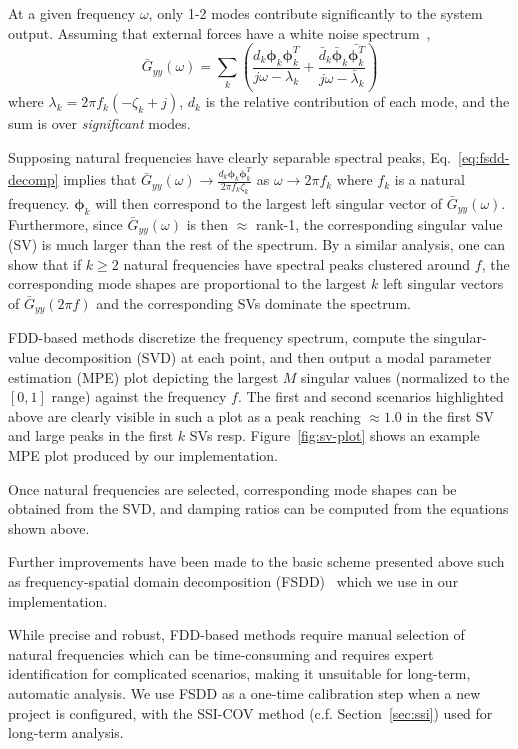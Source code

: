 \documentclass[journal,a4paper]{IEEEtran}
\begin{document}
At a given frequency $\omega$, only 1-2 modes contribute significantly to the system output. Assuming that external forces have a white noise spectrum~\cite{Brincker2000OutputonlyMA}, 
\begin{equation}
\bar{G}_{yy}(\omega)
=
\sum_{k}
\left(
\frac{d_k \bm{\phi}_k \bm{\phi}_k^{T}}{j\omega-\lambda_k}
+
\frac{\bar{d}_k \bar{\bm{\phi}}_k \bar{\bm{\phi}_k^{T}}}
{j\omega-\bar{\lambda}_k}
\right)
\label{eq:fsdd-decomp}
\end{equation}
where $\lambda_k = 2\pi f_k\left(-\zeta_k + j\right)$, $d_k$ is the relative contribution of each mode, and the sum is over \textit{significant} modes.

Supposing natural frequencies have clearly separable spectral peaks, Eq.~\eqref{eq:fsdd-decomp} implies that $\bar{G}_{yy}(\omega) \to \frac{d_k \bm{\phi}_k \bm{\phi}_k^{T}}{2\pi f_k\zeta_k}$ as $\omega \to 2\pi f_k$ where $f_k$ is a natural frequency. $\bm{\phi}_k$ will then correspond to the largest left singular vector of $\bar{G}_{yy}(\omega)$. Furthermore, since $\bar{G}_{yy}(\omega)$ is then $\approx$ rank-1, the corresponding singular value (SV) is much larger than the rest of the spectrum. By a similar analysis, one can show that if $k\ge 2$ natural frequencies have spectral peaks clustered around $f$, the corresponding mode shapes are proportional to the largest $k$ left singular vectors of $\bar{G}_{yy}(2\pi f)$ and the corresponding SVs dominate the spectrum.

FDD-based methods discretize the frequency spectrum, compute the singular-value decomposition (SVD) at each point, and then output a modal parameter estimation (MPE) plot depicting the largest $M$ singular values (normalized to the $[0,1]$ range) against the frequency $f$. The first and second scenarios highlighted above are clearly visible in such a plot as a peak reaching $\approx 1.0$ in the first SV and large peaks in the first $k$ SVs resp. Figure~\ref{fig:sv-plot} shows an example MPE plot produced by our implementation.



Once natural frequencies are selected, corresponding mode shapes can be obtained from the SVD, and damping ratios can be computed from the equations shown above.

Further improvements have been made to the basic scheme presented above such as frequency-spatial domain decomposition (FSDD)~\cite{fsdd} which we use in our implementation.

While precise and robust, FDD-based methods require manual selection of natural frequencies which can be time-consuming and requires expert identification for complicated scenarios, making it unsuitable for long-term, automatic analysis. We use FSDD as a one-time calibration step when a new project is configured, with the SSI-COV method (c.f. Section~\ref{sec:ssi}) used for long-term analysis.
\end{document}
